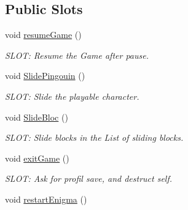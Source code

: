 \subsection*{Public Slots}
\begin{DoxyCompactItemize}
\item 
\hypertarget{class_gameboard_a1447e62dd9f78bcba4bdb06c4bfb8f10}{}void \hyperlink{class_gameboard_a1447e62dd9f78bcba4bdb06c4bfb8f10}{resume\+Game} ()\label{class_gameboard_a1447e62dd9f78bcba4bdb06c4bfb8f10}

\begin{DoxyCompactList}\small\item\em S\+L\+O\+T\+: Resume the Game after pause. \end{DoxyCompactList}\item 
\hypertarget{class_gameboard_ac59525fc331dafd4a1a290593327aa7c}{}void \hyperlink{class_gameboard_ac59525fc331dafd4a1a290593327aa7c}{Slide\+Pingouin} ()\label{class_gameboard_ac59525fc331dafd4a1a290593327aa7c}

\begin{DoxyCompactList}\small\item\em S\+L\+O\+T\+: Slide the playable character. \end{DoxyCompactList}\item 
\hypertarget{class_gameboard_aa4e9c04466f50e1590269eab05773581}{}void \hyperlink{class_gameboard_aa4e9c04466f50e1590269eab05773581}{Slide\+Bloc} ()\label{class_gameboard_aa4e9c04466f50e1590269eab05773581}

\begin{DoxyCompactList}\small\item\em S\+L\+O\+T\+: Slide blocks in the List of sliding blocks. \end{DoxyCompactList}\item 
\hypertarget{class_gameboard_af76ebc877764feed7bc9d90452178f5f}{}void \hyperlink{class_gameboard_af76ebc877764feed7bc9d90452178f5f}{exit\+Game} ()\label{class_gameboard_af76ebc877764feed7bc9d90452178f5f}

\begin{DoxyCompactList}\small\item\em S\+L\+O\+T\+: Ask for profil save, and destruct self. \end{DoxyCompactList}\item 
\hypertarget{class_gameboard_a0de799440eb9030b55bf3f59fa350683}{}void \hyperlink{class_gameboard_a0de799440eb9030b55bf3f59fa350683}{restart\+Enigma} ()\label{class_gameboard_a0de799440eb9030b55bf3f59fa350683}


\end{DoxyCompactItemize}
